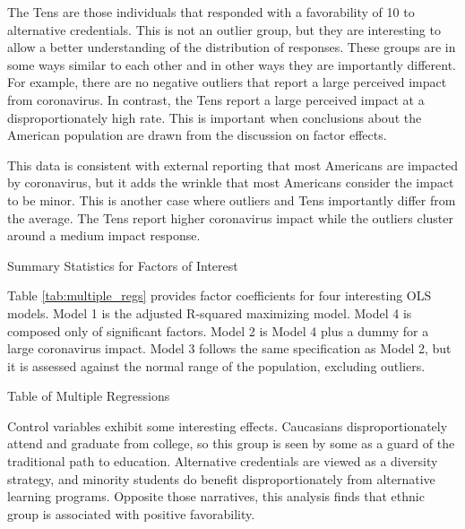 \documentclass[review]{elsarticle}
\begin{document}
The Tens are those individuals that responded with a favorability of 10 to alternative credentials.
This is not an outlier group, but they are interesting to allow a better understanding of the distribution of responses.
These groups are in some ways similar to each other and in other ways they are importantly different.
For example, there are no negative outliers that report a large perceived impact from coronavirus.
In contrast, the Tens report a large perceived impact at a disproportionately high rate.
This is important when conclusions about the American population are drawn from the discussion on factor effects.

This data is consistent with external reporting that most Americans are impacted by coronavirus\cite{demographic2020},
but it adds the wrinkle that most Americans consider the impact to be minor.
This is another case where outliers and Tens importantly differ from the average.
The Tens report higher coronavirus impact while the outliers cluster around a medium impact response.

\begin{table}
    \caption{Summary Statistics for Factors of Interest}
    \resizebox{\columnwidth}{!}{
        
    }
    \label{tab:desc_stats}
\end{table}

Table \ref{tab:multiple_regs} provides factor coefficients for four interesting OLS models.
Model 1 is the adjusted R-squared maximizing model.
Model 4 is composed only of significant factors.
Model 2 is Model 4 plus a dummy for a large coronavirus impact.
Model 3 follows the same specification as Model 2,
but it is assessed against the normal range of the population, excluding outliers.

\begin{table}
    \caption{Table of Multiple Regressions}
    \resizebox{\columnwidth}{!}{
        
    }
    \label{tab:multiple_regs}
\end{table}


Control variables exhibit some interesting effects.
Caucasians disproportionately attend and graduate from college,
so this group is seen by some as a guard of the traditional path to education. %
Alternative credentials are viewed as a diversity strategy,
and minority students do benefit disproportionately from alternative learning programs. %
Opposite those narratives, this analysis finds that ethnic group is associated with positive favorability.
\end{document}

